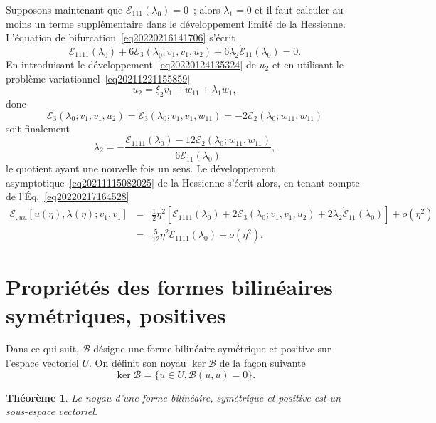\documentclass[12pt, final]{amsart}
\newtheorem{theorem}{Théorème}
\begin{document}
Supposons maintenant que $\mathcal{E}_{1  1  1} (\lambda_0) =
0$~; alors $\lambda_1 = 0$ et il faut calculer au moins un terme
supplémentaire dans le développement limité de la Hessienne.
L'équation de bifurcation~\eqref{eq20220216141706} s'écrit
\begin{equation}
  \label{eq20220217164528} \mathcal{E}_{1  1  1  1}
  (\lambda_0) + 6\mathcal{E}_3 (\lambda_0 ; v_1, v_1, u_2) + 6 \lambda_2
  \dot{\mathcal{E}}_{1  1} (\lambda_0) = 0.
\end{equation}
En introduisant le développement~\eqref{eq20220124135324} de $u_2$ et en
utilisant le problème variationnel~\eqref{eq20211221155859}
\begin{equation}
  u_2 = \xi_2 v_1 + w_{1  1} + \lambda_1 w_1,
\end{equation}
donc
\begin{equation}
  \mathcal{E}_3 (\lambda_0 ; v_1, v_1, u_2) =\mathcal{E}_3 (\lambda_0 ; v_1,
  v_1, w_{1  1}) = - 2\mathcal{E}_2 (\lambda_0 ; w_{11}, w_{11})
\end{equation}
soit finalement
\[ \lambda_2 = - \frac{\mathcal{E}_{1  1  1  1}
   (\lambda_0) - 12\mathcal{E}_2 (\lambda_0 ; w_{11}, w_{11})}{6
   \dot{\mathcal{E}}_{1  1} (\lambda_0)}, \]
le quotient ayant une nouvelle fois un sens. Le développement
asymptotique~\eqref{eq20211115082025} de la Hessienne s'écrit alors, en
tenant compte de l'Éq.~\eqref{eq20220217164528}
\begin{eqnarray}
  \mathcal{E}_{, u  u} [u (\eta), \lambda (\eta) ; v_1, v_1] & = &
  \tfrac{1}{2} \eta^2  [\mathcal{E}_{1  1  1  1}
  (\lambda_0) + 2\mathcal{E}_3 (\lambda_0 ; v_1, v_1, u_2) + 2 \lambda_2
  \dot{\mathcal{E}}_{1  1} (\lambda_0)] + o (\eta^2) \nonumber\\
  & = & \tfrac{5}{12} \eta^2 \mathcal{E}_{1  1  1  1}
  (\lambda_0) + o (\eta^2) .
\end{eqnarray}

\section{Propriétés des formes bilinéaires symétriques,
positives}

Dans ce qui suit, $\mathcal{B}$ désigne une forme bilinéaire
symétrique et positive sur l'espace vectoriel $U$. On définit son
noyau $\ker \mathcal{B}$ de la fa{\c c}on suivante
\begin{equation}
  \ker \mathcal{B}= \{u \in U, \mathcal{B}(u, u) = 0\} .
\end{equation}
\begin{theorem}
  Le noyau d'une forme bilinéaire, symétrique et positive est un
  sous-espace vectoriel.
\end{theorem}
\end{document}
